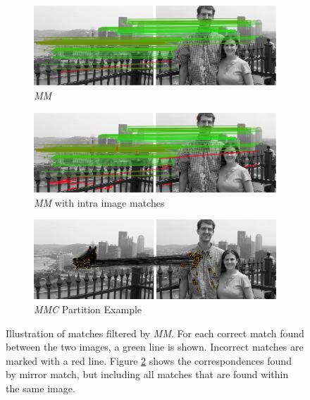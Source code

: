 \documentclass[12pt,journal]{IEEEtran}
\begin{document}
\begin{figure}
{\begin{subfigure}[t]{0.32\textwidth}
			\includegraphics[width=\textwidth]{images/mirror_match}
			\caption{\emph{MM}}
			\label{fig:without}
		\end{subfigure}%
		\enspace%
		\begin{subfigure}[t]{0.32\textwidth}
			\centering
			\includegraphics[width=\textwidth]{images/mirror_match_with_pruned}
			\caption{\emph{MM} with intra image matches}
			\label{fig:within}
		\end{subfigure}%
		\enspace %
		\begin{subfigure}[t]{0.32\textwidth}
			\centering
			\includegraphics[width=\textwidth]{images/MMC_partition}
			\caption{\emph{MMC} Partition Example}
			\label{fig:pitts_partition}
		\end{subfigure}%
	}%
	\caption{Illustration of matches filtered by \emph{MM}. For each 
	correct match found between the two images, a green line is shown.  
Incorrect matches are marked with a red line. Figure \ref{fig:within} 
shows the correspondences found by mirror match, but including all 
matches that are found within the same image. }%
	\label{fig:comparemirror}%
\end{figure}%
\end{document}
